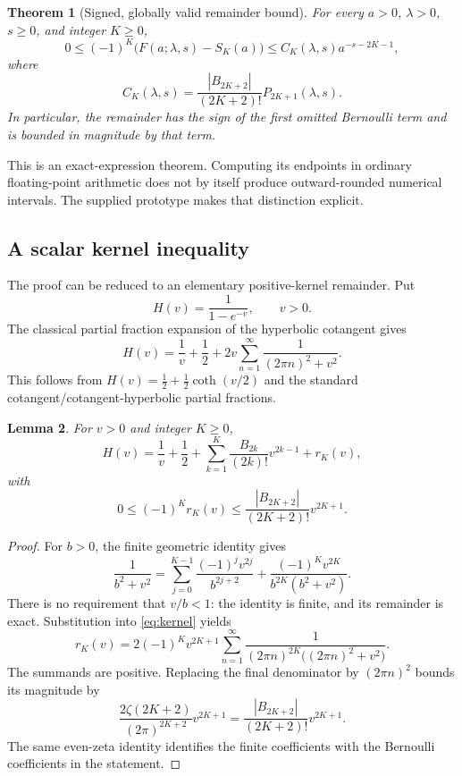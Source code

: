 \documentclass[11pt,a4paper]{article}
\newtheorem{theorem}{Theorem}[section]
\newtheorem{lemma}[theorem]{Lemma}
\begin{document}
\begin{theorem}[Signed, globally valid remainder bound]
\label{thm:bound}
For every $a>0$, $\lambda>0$, $s\geq0$, and integer $K\geq0$,
\begin{equation}
 0\leq(-1)^K\bigl(F(a;\lambda,s)-S_K(a)\bigr)
 \leq C_K(\lambda,s)a^{-s-2K-1},
 \label{eq:bound}
\end{equation}
where
\begin{equation}
 C_K(\lambda,s)=\frac{|B_{2K+2}|}{(2K+2)!}
                P_{2K+1}(\lambda,s).
 \label{eq:boundconstant}
\end{equation}
In particular, the remainder has the sign of the first omitted Bernoulli
term and is bounded in magnitude by that term.
\end{theorem}

This is an exact-expression theorem. Computing its endpoints in ordinary
floating-point arithmetic does not by itself produce outward-rounded
numerical intervals. The supplied prototype makes that distinction explicit.

\subsection{A scalar kernel inequality}

The proof can be reduced to an elementary positive-kernel remainder. Put
\[
 H(v)=\frac1{1-e^{-v}},\qquad v>0.
\]
The classical partial fraction expansion of the hyperbolic cotangent gives
\begin{equation}
 H(v)=\frac1v+\frac12+
       2v\sum_{n=1}^{\infty}\frac1{(2\pi n)^2+v^2}.
 \label{eq:kernel}
\end{equation}
This follows from $H(v)=\tfrac12+\tfrac12\coth(v/2)$ and the standard
cotangent/cotangent-hyperbolic partial fractions.\cite{coth}

\begin{lemma}
For $v>0$ and integer $K\geq0$,
\[
 H(v)=\frac1v+\frac12+
       \sum_{k=1}^{K}\frac{B_{2k}}{(2k)!}v^{2k-1}+r_K(v),
\]
with
\[
 0\leq(-1)^K r_K(v)
 \leq\frac{|B_{2K+2}|}{(2K+2)!}v^{2K+1}.
\]
\end{lemma}

\begin{proof}
For $b>0$, the finite geometric identity gives
\[
 \frac1{b^2+v^2}
 =\sum_{j=0}^{K-1}\frac{(-1)^jv^{2j}}{b^{2j+2}}
  +\frac{(-1)^Kv^{2K}}{b^{2K}(b^2+v^2)}.
\]
There is no requirement that $v/b<1$: the identity is finite, and its
remainder is exact. Substitution into \eqref{eq:kernel} yields
\[
 r_K(v)=2(-1)^Kv^{2K+1}
 \sum_{n=1}^{\infty}
 \frac1{(2\pi n)^{2K}\bigl((2\pi n)^2+v^2\bigr)}.
\]
The summands are positive. Replacing the final denominator by $(2\pi n)^2$
bounds its magnitude by
\[
 \frac{2\zeta(2K+2)}{(2\pi)^{2K+2}}v^{2K+1}
 =\frac{|B_{2K+2}|}{(2K+2)!}v^{2K+1}.
\]
The same even-zeta identity identifies the finite coefficients with the
Bernoulli coefficients in the statement.\cite{bernoulli}
\end{proof}
\end{document}
